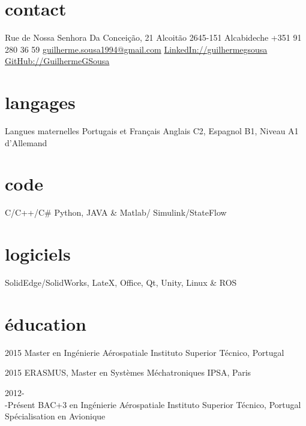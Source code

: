 \documentclass[]{friggeri-cv} %
\begin{document}


\begin{aside} %
\section{contact}
Rue de Nossa Senhora Da Conceição, 21
Alcoitão
2645-151 Alcabideche\newline
+351 91 280 36 59
\href{mailto:guilherme.sousa1994@gmail.com}{guilherme.sousa1994\newline @gmail.com}
\href{https://www.linkedin.com/in/guilhermegsousa}{LinkedIn://guilhermegsousa}
\href{https://github.com/GuilhermeGSousa}{GitHub://GuilhermeGSousa}
\section{langages}
Langues maternelles Portugais et Français 
Anglais C2,
Espagnol B1,
Niveau A1 d'Allemand
\section{code}
C/C++/C\#
Python,
JAVA \& Matlab/ Simulink/StateFlow
\section{logiciels}
SolidEdge/SolidWorks,
LateX, Office, Qt, Unity,
Linux \& ROS
\end{aside}


\section{éducation}

\begin{entrylist}


\entry
{2015}
{Master {\normalfont en Ingénierie Aérospatiale}}
{Instituto Superior Técnico, Portugal}
{\emph{} \\ }%


\entry
{2015}
{ERASMUS, Master {\normalfont en Systèmes Méchatroniques} }
{IPSA, Paris}
{\emph{} \\ }

\entry
{2012-\\-Présent}
{BAC+3 {\normalfont en Ingénierie Aérospatiale}}
{Instituto Superior Técnico, Portugal}
{Spécialisation en Avionique}


\end{entrylist}
\end{document}
